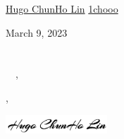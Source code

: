 \documentclass[12pt]{letter}
\begin{document}
\AddToShipoutPictureBG{%
\color{gr}
\AtPageUpperLeft{\rule[-1.3in]{\paperwidth}{1.3in}}
}

\begin{center}
{\fontsize{28}{0}\selectfont\scshape \myname}

\href{mailto:\myemail}{\faEnvelope\enspace \myemail}\hfill
\href{https://www.linkedin.com/in/1chooo/}{\faLinkedinIn\enspace Hugo ChunHo Lin}\hfill
\href{tel:\myphone}{\faPhone\enspace \myphone}\hfill
\href{https://github.com/1chooo}{\faGithub\enspace 1chooo}
\end{center}


\vspace{0.2in}

March 9, 2023\\

\vspace{-0.1in}\recipient\\
\company\\

\vspace{-0.1in}\greeting\ \recipient\ \commited,\\

\vspace{-0.1in}\setlength\parindent{24pt}
\noindent

\vspace{0.1in}
\vfill

\begin{flushright}
\closer,

\vspace{-0.1in}\includegraphics[width=1.5in]{sig.png}\vspace{-0.1in}

\myname\\
\mytitle
\end{flushright}

% 
\end{document}
